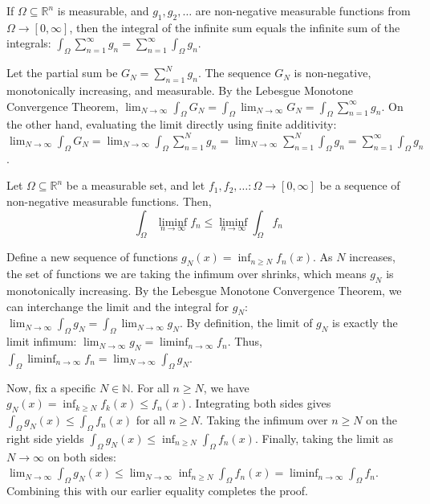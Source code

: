 \begin{corollary}
    If $\Omega \subseteq \mathbb{R}^n$ is measurable, and $g_1, g_2, \dots$ are non-negative measurable functions from $\Omega \rightarrow [0, \infty]$, then the integral of the infinite sum equals the infinite sum of the integrals: $\int_\Omega \displaystyle\sum_{n=1}^\infty g_n = \displaystyle\sum_{n=1}^\infty \int_\Omega g_n$.
\end{corollary}
\begin{pfbox}
    Let the partial sum be $G_N = \displaystyle\sum_{n=1}^N g_n$. The sequence $G_N$ is non-negative, monotonically increasing, and measurable.
    By the Lebesgue Monotone Convergence Theorem, $\displaystyle\lim_{N\to\infty} \int_\Omega G_N = \int_\Omega \lim_{N\to\infty} G_N = \int_\Omega \displaystyle\sum_{n=1}^\infty g_n$.
    On the other hand, evaluating the limit directly using finite additivity:
    $\displaystyle\lim_{N\to\infty} \int_\Omega G_N = \displaystyle\lim_{N\to\infty} \int_\Omega \displaystyle\sum_{n=1}^N g_n = \displaystyle\lim_{N\to\infty} \displaystyle\sum_{n=1}^N \int_\Omega g_n = \displaystyle\sum_{n=1}^\infty \int_\Omega g_n$.
\end{pfbox}

\begin{lemma}[Fatou]
    Let $\Omega \subseteq \mathbb{R}^n$ be a measurable set, and let $f_1, f_2, \dots : \Omega \rightarrow [0, \infty]$ be a sequence of non-negative measurable functions. Then,
    $$ \int_\Omega \liminf_{n\to\infty} f_n \le \liminf_{n\to\infty} \int_\Omega f_n $$
\end{lemma}
\begin{pfbox}
    Define a new sequence of functions $g_N(x) = \inf_{n \ge N} f_n(x)$. As $N$ increases, the set of functions we are taking the infimum over shrinks, which means $g_N$ is monotonically increasing.
    By the Lebesgue Monotone Convergence Theorem, we can interchange the limit and the integral for $g_N$: $\displaystyle\lim_{N\to\infty} \int_\Omega g_N = \int_\Omega \lim_{N\to\infty} g_N$.
    By definition, the limit of $g_N$ is exactly the limit infimum: $\displaystyle\lim_{N\to\infty} g_N = \liminf_{n\to\infty} f_n$.
    Thus, $\int_\Omega \liminf_{n\to\infty} f_n = \displaystyle\lim_{N\to\infty} \int_\Omega g_N$.
    
    Now, fix a specific $N \in \mathbb{N}$. For all $n \ge N$, we have $g_N(x) = \inf_{k \ge N} f_k(x) \le f_n(x)$.
    Integrating both sides gives $\int_\Omega g_N(x) \le \int_\Omega f_n(x)$ for all $n \ge N$. Taking the infimum over $n \ge N$ on the right side yields $\int_\Omega g_N(x) \le \inf_{n \ge N} \int_\Omega f_n(x)$.
    Finally, taking the limit as $N \to \infty$ on both sides:
    $\displaystyle\lim_{N\to\infty} \int_\Omega g_N(x) \le \lim_{N\to\infty} \inf_{n \ge N} \int_\Omega f_n(x) = \liminf_{n\to\infty} \int_\Omega f_n$.
    Combining this with our earlier equality completes the proof.
\end{pfbox}

